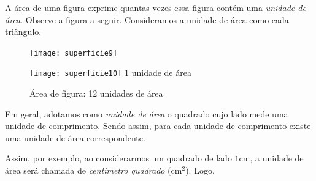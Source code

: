A área de uma figura exprime quantas vezes essa figura contém uma \textit{unidade de área}. Observe a figura a seguir. Consideramos a unidade de área como cada triângulo.
\begin{multicols}{2}
\begin{figure}[H]
\centering

\texttt{[image: superficie9]}
\end{figure}
\columnbreak

\null\vfill
\begin{figure}[H]
\centering

\texttt{[image: superficie10]}
$1$ unidade de área

\medskip

Área de figura: 12 unidades de área
\end{figure}
\vfill\null
\end{multicols}

Em geral, adotamos como \textit{unidade de área} o quadrado cujo lado mede uma unidade de comprimento. Sendo assim, para cada unidade de comprimento existe uma unidade de área correspondente.

\begin{figure}[H]
\centering

\end{figure}

Assim, por exemplo, ao considerarmos um quadrado de lado $1$cm, a unidade de área será chamada de \textit{centímetro quadrado} (cm$^2$). Logo,



\begin{figure}[H]
\centering

\end{figure}

